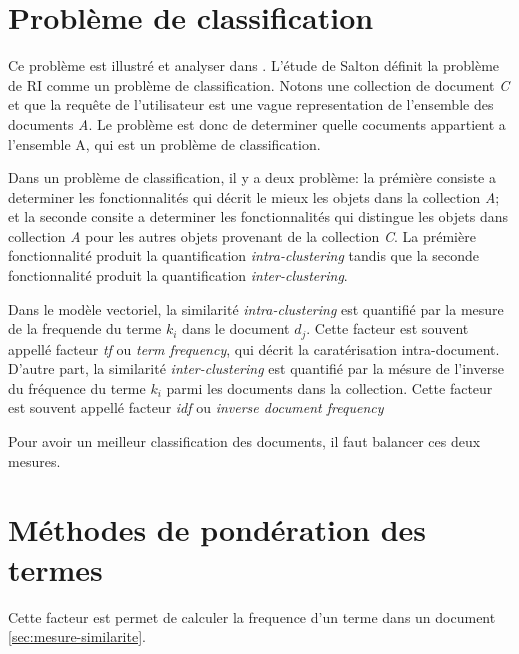 \section{Problème de classification}
Ce problème est illustré et analyser dans \citep{modern-ir}. L'étude de Salton définit la problème de RI comme un problème de classification. Notons une collection de document \emph{C} et que la requête de l'utilisateur est une vague representation de l'ensemble des documents \emph{A}. Le problème est donc de determiner quelle cocuments appartient a l'ensemble A, qui est un problème de classification.

Dans un problème de classification, il y a deux problème: la prémière consiste a determiner les fonctionnalités qui décrit le mieux les objets dans la collection \emph{A}; et la seconde consite a determiner les fonctionnalités qui distingue les objets dans collection \emph{A} pour les autres objets provenant de la collection \emph{C}. La prémière fonctionnalité produit la quantification \emph{intra-clustering} tandis que la seconde fonctionnalité produit la quantification \emph{inter-clustering}.

Dans le modèle vectoriel, la similarité \emph{intra-clustering} est quantifié par la mesure de la frequende du terme $k_{i}$ dans le document $d_{j}$. Cette facteur est souvent appellé facteur \emph{tf} ou \emph{term frequency}, qui décrit la caratérisation intra-document. D'autre part, la similarité \emph{inter-clustering} est quantifié par la mésure de l'inverse du fréquence du terme $k_{i}$ parmi les documents dans la collection. Cette facteur est souvent appellé facteur \emph{idf} ou \emph{inverse document frequency}

Pour avoir un meilleur classification des documents, il faut balancer ces deux mesures.

\section{Méthodes de pondération des termes}
Cette facteur est permet de calculer la frequence d'un terme dans un document \ref{sec:mesure-similarite}.

